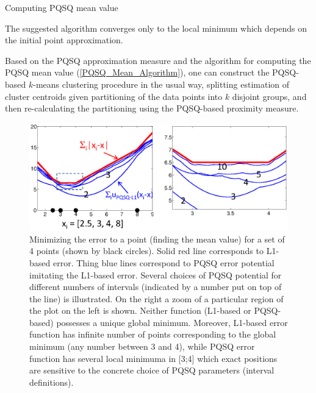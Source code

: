 \documentclass[preprint,12pt]{elsarticle}
\makeatletter
\def\BState{\State\hskip-\ALG@thistlm}
\makeatother
\begin{document}
\begin{algorithm}
\caption{Computing PQSQ mean value}\label{PQSQ_Mean_Algorithm}
\end{algorithm}

The suggested algorithm converges only to the local minimum which depends on the initial point approximation.

Based on the PQSQ approximation measure and the algorithm for computing the PQSQ mean value (\ref{PQSQ_Mean_Algorithm}), one can construct the PQSQ-based $k$-means clustering procedure in the usual way, splitting estimation of cluster centroids given partitioning of the data points into $k$ disjoint groups, and then re-calculating the partitioning using the PQSQ-based proximity measure.

\begin{figure}[h]
\centering\includegraphics[width=0.9\linewidth]{MeanValue.eps}
\caption{Minimizing the error to a point (finding the mean value) for a set of 4 points (shown by black circles). Solid red line corresponds to L1-based error. Thing blue lines correspond to PQSQ error potential imitating the L1-based error. Several choices of PQSQ potential for different numbers of intervals (indicated by a number put on top of the line) is illustrated. On the right a zoom of a particular region of the plot on the left is shown. Neither function (L1-based or PQSQ-based) possesses a unique global minimum. Moreover, L1-based error function has infinite number of points corresponding to the global minimum (any number between 3 and 4), while PQSQ error function has several local minimuma in [3;4] which exact positions are sensitive to the concrete choice of PQSQ parameters (interval definitions).}\label{MeanValueFigure}
\end{figure}
\end{document}
